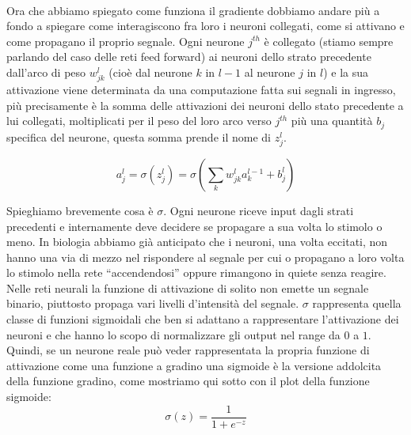 \\
Ora che abbiamo spiegato come funziona il gradiente dobbiamo andare più a fondo a spiegare come interagiscono fra loro i neuroni collegati, come si attivano e come propagano il proprio segnale.
Ogni neurone $j^{th}$ è collegato (stiamo sempre parlando del caso delle reti feed forward) ai neuroni dello strato precedente dall'arco di peso $w^{l}_{jk}$ (cioè dal neurone $k$ in $l-1$ al neurone $j$ in $l$) e la sua attivazione viene determinata da una computazione fatta sui segnali in ingresso, più precisamente è la somma delle attivazioni dei neuroni dello stato precedente a lui collegati, moltiplicati per il peso del loro arco verso $j^{th}$ più una quantità $b_{j}$ specifica del neurone, questa somma prende il nome di $z^{l}_{j}$. 

\begin{equation}
\displaystyle a^{l}_{j}=\sigma\left( z^{l}_{j}\right) = \sigma \left( \sum_{k}w^{l}_{jk}a^{l-1}_k +b^{l}_{j} \right)
\end{equation}

Spieghiamo brevemente cosa è $\sigma$. Ogni neurone riceve input dagli strati precedenti e internamente deve decidere se propagare a sua volta lo stimolo o meno. In biologia abbiamo già anticipato che i neuroni, una volta eccitati, non hanno una via di mezzo nel rispondere al segnale per cui o propagano a loro volta lo stimolo nella rete ``accendendosi''  oppure rimangono in quiete senza reagire. Nelle reti neurali la funzione di attivazione di solito non emette un segnale binario, piuttosto propaga vari livelli d'intensità del segnale. $\sigma$ rappresenta quella classe di funzioni sigmoidali che ben si adattano a rappresentare l'attivazione dei neuroni e che hanno lo scopo di normalizzare gli output nel range da $0$ a $1$. Quindi, se un neurone reale può veder rappresentata la propria funzione di attivazione come una funzione a gradino una sigmoide è la versione addolcita della funzione gradino, come mostriamo qui sotto con il plot della funzione sigmoide:
\begin{equation}
	\sigma(z)=\dfrac{1}{1+e^{-z}}
\end{equation}

